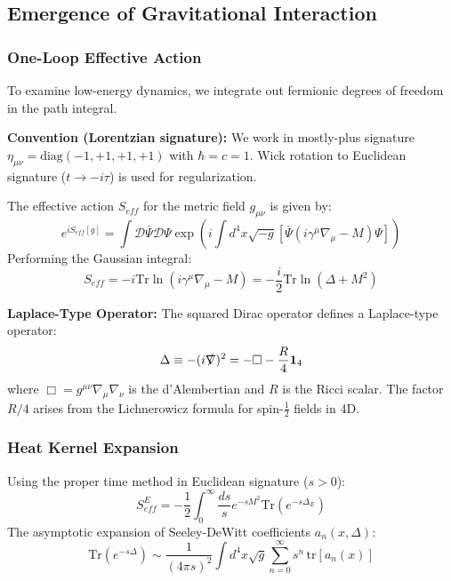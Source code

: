 \documentclass[a4paper,12pt]{article}
\begin{document}
\subsection{Emergence of Gravitational Interaction}

\subsubsection{One-Loop Effective Action}
To examine low-energy dynamics, we integrate out fermionic degrees of freedom in the path integral. 

\textbf{Convention (Lorentzian signature):}
We work in mostly-plus signature $\eta_{\mu\nu} = \text{diag}(-1, +1, +1, +1)$ with $\hbar = c = 1$. Wick rotation to Euclidean signature ($t \to -i\tau$) is used for regularization.

The effective action $S_{eff}$ for the metric field $g_{\mu\nu}$ is given by:
\begin{equation}
 e^{i S_{eff}[g]} = \int \mathcal{D}\bar{\Psi} \mathcal{D}\Psi \exp \left( i \int d^4x \sqrt{-g} \left[ \bar{\Psi} (i \gamma^\mu \nabla_\mu - M) \Psi \right] \right)
\end{equation}
Performing the Gaussian integral:
\begin{equation}
 S_{eff} = -i \text{Tr} \ln (i \gamma^\mu \nabla_\mu - M) = -\frac{i}{2} \text{Tr} \ln (\Delta + M^2)
\end{equation}

\textbf{Laplace-Type Operator:}
The squared Dirac operator defines a Laplace-type operator:
\begin{equation}
    \Delta \equiv -(i\slashed{\nabla})^2 = -\Box - \frac{R}{4} \mathbf{1}_4
\end{equation}
where $\Box = g^{\mu\nu}\nabla_\mu\nabla_\nu$ is the d'Alembertian and $R$ is the Ricci scalar. The factor $R/4$ arises from the Lichnerowicz formula for spin-$\frac{1}{2}$ fields in 4D.

\subsubsection{Heat Kernel Expansion}
Using the proper time method in Euclidean signature ($s > 0$):
\begin{equation}
 S_{eff}^E = -\frac{1}{2} \int_0^\infty \frac{ds}{s} e^{-sM^2} \text{Tr} (e^{-s\Delta_E})
\end{equation}
The asymptotic expansion of Seeley-DeWitt coefficients $a_n(x, \Delta)$:
\begin{equation}
 \text{Tr} (e^{-s\Delta}) \sim \frac{1}{(4\pi s)^2} \int d^4x \sqrt{g} \sum_{n=0}^{\infty} s^n \, \text{tr}[a_n(x)]
\end{equation}
\end{document}
